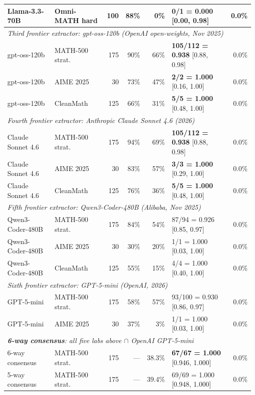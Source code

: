 \documentclass{article}
\begin{document}
\begin{table}[t]
\begin{tabular}{llrrrlr}
Llama-3.3-70B & Omni-MATH hard & 100 & 88\% & \textbf{0\%} & \textbf{0/1 = 0.000} [0.00, 0.98] & 0.0\% \\
\midrule
\multicolumn{7}{l}{\emph{Third frontier extractor: gpt-oss-120b (OpenAI open-weights, Nov 2025)}}\\
gpt-oss-120b & MATH-500 strat. & 175 & 90\% & 66\% & \textbf{105/112 = 0.938} [0.88, 0.98] & 0.0\% \\
gpt-oss-120b & AIME 2025 & 30 & 73\% & 47\% & \textbf{2/2 = 1.000} [0.16, 1.00] & 0.0\% \\
gpt-oss-120b & CleanMath & 125 & 66\% & 31\% & \textbf{5/5 = 1.000} [0.48, 1.00] & 0.0\% \\
\midrule
\multicolumn{7}{l}{\emph{Fourth frontier extractor: Anthropic Claude Sonnet 4.6 (2026)}}\\
Claude Sonnet 4.6 & MATH-500 strat. & 175 & 94\% & 69\% & \textbf{105/112 = 0.938} [0.88, 0.98] & 0.0\% \\
Claude Sonnet 4.6 & AIME 2025 & 30 & 83\% & 57\% & \textbf{3/3 = 1.000} [0.29, 1.00] & 0.0\% \\
Claude Sonnet 4.6 & CleanMath & 125 & 76\% & 36\% & \textbf{5/5 = 1.000} [0.48, 1.00] & 0.0\% \\
\midrule
\multicolumn{7}{l}{\emph{Fifth frontier extractor: Qwen3-Coder-480B (Alibaba, Nov 2025)}}\\
Qwen3-Coder-480B & MATH-500 strat. & 175 & 84\% & 54\% & 87/94 = 0.926 [0.85, 0.97] & 0.0\% \\
Qwen3-Coder-480B & AIME 2025 & 30 & 30\% & 20\% & 1/1 = 1.000 [0.03, 1.00] & 0.0\% \\
Qwen3-Coder-480B & CleanMath & 125 & 55\% & 15\% & 4/4 = 1.000 [0.40, 1.00] & 0.0\% \\
\midrule
\multicolumn{7}{l}{\emph{Sixth frontier extractor: GPT-5-mini (OpenAI, 2026)}}\\
GPT-5-mini & MATH-500 strat. & 175 & 58\% & 57\% & 93/100 = 0.930 [0.86, 0.97] & 0.0\% \\
GPT-5-mini & AIME 2025 & 30 & 37\% & 3\% & 1/1 = 1.000 [0.03, 1.00] & 0.0\% \\
\midrule
\multicolumn{7}{l}{\emph{\textbf{6-way consensus}: all five labs above $\cap$ OpenAI GPT-5-mini}}\\
6-way consensus & MATH-500 strat. & 175 & --- & 38.3\% & \textbf{67/67 = 1.000} [0.946, 1.000] & 0.0\% \\
5-way consensus & MATH-500 strat. & 175 & --- & 39.4\% & 69/69 = 1.000 [0.948, 1.000] & 0.0\% \\

\end{tabular}
\end{table}
\end{document}
